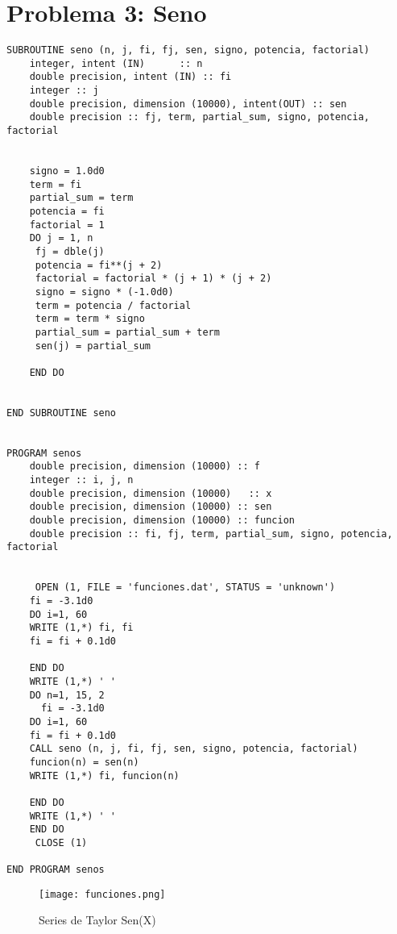 \documentclass{article}
\begin{document}
\section{Problema 3: Seno}
\begin{verbatim}
SUBROUTINE seno (n, j, fi, fj, sen, signo, potencia, factorial)
	integer, intent (IN)      :: n
	double precision, intent (IN) :: fi
	integer :: j
	double precision, dimension (10000), intent(OUT) :: sen
	double precision :: fj, term, partial_sum, signo, potencia, factorial

	
	signo = 1.0d0
	term = fi
	partial_sum = term
	potencia = fi
	factorial = 1
	DO j = 1, n
	 fj = dble(j)
	 potencia = fi**(j + 2)
	 factorial = factorial * (j + 1) * (j + 2)
	 signo = signo * (-1.0d0)
	 term = potencia / factorial
	 term = term * signo
	 partial_sum = partial_sum + term
	 sen(j) = partial_sum
	 
	END DO

	 
END SUBROUTINE seno
	 

PROGRAM senos
	double precision, dimension (10000) :: f
	integer :: i, j, n
	double precision, dimension (10000)   :: x
	double precision, dimension (10000) :: sen
	double precision, dimension (10000) :: funcion
	double precision :: fi, fj, term, partial_sum, signo, potencia, factorial
	

     OPEN (1, FILE = 'funciones.dat', STATUS = 'unknown')
	fi = -3.1d0
	DO i=1, 60
	WRITE (1,*) fi, fi
	fi = fi + 0.1d0
	
	END DO
	WRITE (1,*) ' '
	DO n=1, 15, 2
	  fi = -3.1d0
	DO i=1, 60
	fi = fi + 0.1d0
	CALL seno (n, j, fi, fj, sen, signo, potencia, factorial)
	funcion(n) = sen(n)
	WRITE (1,*) fi, funcion(n)

	END DO
	WRITE (1,*) ' '
	END DO
     CLOSE (1)

END PROGRAM senos
\end{verbatim}

\begin{figure}[h!]
  \texttt{[image: funciones.png]}
  \caption{Series de Taylor Sen(X)}
  \label{fi}
\end{figure}
\end{document}

